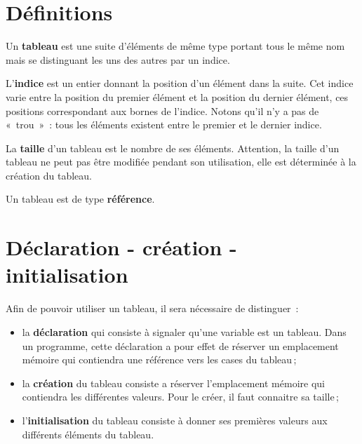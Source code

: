 		
	\section{Définitions}
	
		Un \textbf{tableau} est une suite d’éléments de même type 
		portant tous le même nom mais se distinguant 
		les uns des autres par un indice.
	
		L’\textbf{indice} est un entier
		donnant la position d’un élément dans la suite. 
		Cet indice varie entre la position du premier élément 
		et la position du dernier élément, 
		ces positions correspondant aux bornes de l’indice.
		Notons qu’il n’y a pas de «~trou~»~: 
		tous les éléments existent entre le premier et le dernier indice.
	
		La \textbf{taille} d’un tableau est le nombre de
		ses éléments.  Attention, la taille d’un tableau ne peut pas être
		modifiée pendant son utilisation, elle est déterminée à la création du
		tableau.

		Un tableau est de type \textbf{référence}.
	
	\section{Déclaration - création - initialisation}

		Afin de pouvoir utiliser un tableau, il sera nécessaire de distinguer~:
		\begin{itemize}

			\item la \textbf{déclaration} qui consiste à signaler qu'une
				variable est un tableau. Dans un programme, cette déclaration
				a pour effet de réserver un emplacement mémoire qui contiendra
				une référence vers les cases du tableau\,; 

			\item la \textbf{création} du tableau consiste a réserver
				l'emplacement mémoire qui contiendra les différentes valeurs.
				Pour le créer, il faut connaitre sa taille\,; 

			\item l'\textbf{initialisation} du tableau consiste à donner ses
				premières valeurs aux différents éléments du tableau.
		
		\end{itemize}


